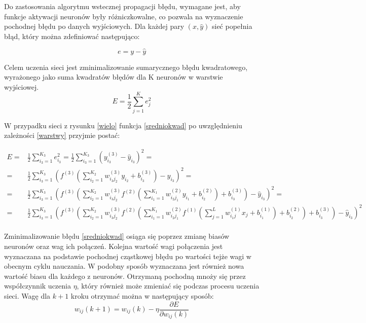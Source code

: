 \documentclass[12pt,twoside]{article}
\begin{document}
Do zastosowania algorytmu wstecznej propagacji błędu, wymagane jest, aby funkcje aktywacji neuronów były różniczkowalne, co pozwala na wyznaczenie pochodnej błędu po danych wyjściowych. Dla każdej pary $(x, \hat{y})$ sieć popełnia błąd, który można zdefiniować następująco:

\begin{equation}
e = y - \hat{y}
\end{equation}

Celem uczenia sieci jest zminimalizowanie sumarycznego błędu kwadratowego, wyrażonego jako suma kwadratów błędów dla K neuronów w warstwie wyjściowej.
\begin{equation}\label{sredniokwad}
E = \frac{1}{2} \sum_{j=1}^{K} e_{j}^2
\end{equation}

W przypadku sieci z rysunku \ref{wielo} funkcja \ref{sredniokwad} po uwzględnieniu zależności \ref{warstwy} przyjmie postać:

\begin{equation}
\begin{aligned}
E =& \frac{1}{2} \sum_{i_{3}=1}^{K_{3}} e_{i_{3}}^2 = \frac{1}{2} \sum_{i_{3}=1}^{K_{3}}\left( y_{i_{3}}^{(3)} - \hat{y}_{i_{3}} \right)^2 =\\
 =& \frac{1}{2} \sum_{i_{3}=1}^{K_{3}} \left( f^{(3)}\left( \sum_{i_{2}=1}^{K_{2}} w_{i_{3}j_{2}}^{(3)}y_{i_{2}} + b_{i_{3}}^{(3)} \right) - \hat{y}_{i_{3}} \right)^2 =\\
=& \frac{1}{2} \sum_{i_{3}=1}^{K_{3}} \left( f^{(3)}\left( \sum_{i_{2}=1}^{K_{2}} w_{i_{3}j_{2}}^{(3)} f^{(2)}\left( \sum_{i_{1}=1}^{K_{1}} w_{i_{2}j_{1}}^{(2)} y_{i_{1}} + b_{i_{2}}^{(2)} \right) + b_{i_{3}}^{(3)} \right) - \hat{y}_{i_{3}} \right)^2 =\\
=& \frac{1}{2} \sum_{i_{3}=1}^{K_{3}} \left( f^{(3)}\left( \sum_{i_{2}=1}^{K_{2}} w_{i_{3}j_{2}}^{(3)} f^{(2)}\left( \sum_{i_{1}=1}^{K_{1}} w_{i_{2}j_{1}}^{(2)} f^{(1)}\left( \sum_{j=1}^{L} w_{i_{1}j}^{(1)} x_{j} + b_{i_{1}}^{(1)} \right) + b_{i_{2}}^{(2)} \right) + b_{i_{3}}^{(3)} \right) - \hat{y}_{i_{3}} \right)^2 
\end{aligned}
\end{equation}\\

Zminimalizowanie błędu \ref{sredniokwad} osiąga się poprzez zmianę biasów neuronów oraz wag ich połączeń. Kolejna wartość wagi połączenia jest wyznaczana na podstawie pochodnej cząstkowej błędu po wartości tejże wagi w obecnym cyklu nauczania. W podobny sposób wyznaczana jest również nowa wartość biasu dla każdego z neuronów. Otrzymaną pochodną mnoży się przez współczynnik uczenia $\eta$, który również może zmieniać się podczas procesu uczenia sieci. Wagę dla $k+1$ kroku otrzymać można w następujący sposób:\\
\begin{equation}
w_{ij}(k+1) = w_{ij}(k) - \eta \frac{\partial E}{\partial w_{ij}(k)}
\end{equation}\\
\end{document}
